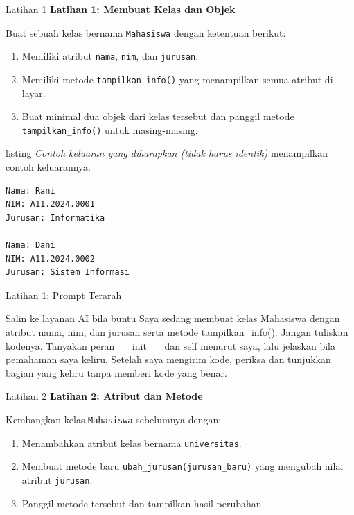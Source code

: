 \documentclass[aspectratio=169, table]{beamer}
\begin{document}
\begin{frame}[fragile,allowframebreaks=0.8]{Latihan 1}
\footnotesize
\textbf{Latihan 1: Membuat Kelas dan Objek}\par\medskip
Buat sebuah kelas bernama \texttt{Mahasiswa} dengan ketentuan berikut:
\begin{enumerate}
    \item Memiliki atribut \texttt{nama}, \texttt{nim}, dan \texttt{jurusan}.
    \item Memiliki metode \texttt{tampilkan\_info()} yang menampilkan semua atribut di layar.
    \item Buat minimal dua objek dari kelas tersebut dan panggil metode \texttt{tampilkan\_info()} untuk masing-masing.
\end{enumerate}

listing \textit{Contoh keluaran yang diharapkan (tidak harus identik)} menampilkan contoh keluarannya.

\begin{lstlisting}[language=bash, breaklines=true, basicstyle=\ttfamily\scriptsize]
Nama: Rani
NIM: A11.2024.0001
Jurusan: Informatika

Nama: Dani
NIM: A11.2024.0002
Jurusan: Sistem Informasi
\end{lstlisting}
\end{frame}

\begin{frame}{Latihan 1: Prompt Terarah}
\begin{block}{Salin ke layanan AI bila buntu}
\small Saya sedang membuat kelas Mahasiswa dengan atribut nama, nim, dan jurusan serta metode tampilkan\_info(). Jangan tuliskan kodenya. Tanyakan peran \_\_init\_\_ dan self menurut saya, lalu jelaskan bila pemahaman saya keliru. Setelah saya mengirim kode, periksa dan tunjukkan bagian yang keliru tanpa memberi kode yang benar.
\end{block}
\end{frame}

\begin{frame}[fragile,allowframebreaks=0.8]{Latihan 2}
\footnotesize
\textbf{Latihan 2: Atribut dan Metode}\par\medskip
Kembangkan kelas \texttt{Mahasiswa} sebelumnya dengan:
\begin{enumerate}
    \item Menambahkan atribut kelas bernama \texttt{universitas}.
    \item Membuat metode baru \texttt{ubah\_jurusan(jurusan\_baru)} yang mengubah nilai atribut \texttt{jurusan}.
    \item Panggil metode tersebut dan tampilkan hasil perubahan.
\end{enumerate}
\end{frame}
\end{document}
